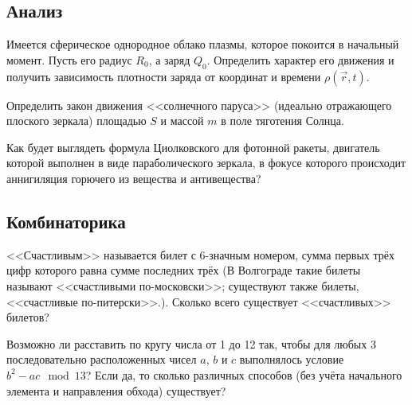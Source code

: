     \subsection{Анализ}
    \begin{problem}
        Имеется сферическое однородное облако плазмы, которое покоится в
        начальный момент. Пусть его радиус \( R_0 \), а заряд \( Q_0 \).
        Определить характер его движения и получить зависимость плотности заряда
        от координат и времени \( \rho(\vec{r}, t) \).
    \end{problem}
    \begin{problem}
        Определить закон движения <<солнечного паруса>> (идеально
        отражающего плоского зеркала) площадью \( S \) и массой \(m\) в поле
        тяготения Солнца.
    \end{problem}
    \begin{problem}
        Как будет выглядеть формула Циолковского для фотонной ракеты, двигатель
        которой выполнен в виде параболического зеркала, в фокусе которого
        происходит аннигиляция горючего из вещества и антивещества?
    \end{problem}
    \subsection{Комбинаторика}
    \begin{problem}
        <<Счастливым>> называется билет с 6-значным номером, сумма первых трёх
        цифр которого равна сумме последних трёх (В Волгограде такие билеты называют 
        <<счастливыми по-московски>>; существуют также билеты, <<счастливые по-питерски>>.). 
        Сколько всего существует <<счастливых>> билетов?
    \end{problem}
    \begin{problem}
        Возможно ли расставить по кругу числа от 1 до 12 так, чтобы для любых 3
        последовательно расположенных чисел \(a\), \(b\) и \(c\) выполнялось
        условие \( b^2 - ac \mod 13 \)? Если да, то сколько различных
        способов (без учёта начального элемента и направления обхода) существует?
    \end{problem}